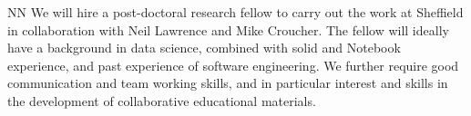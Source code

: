\begin{participant}[type=R, PM=36]{NN}
  We will hire a post-doctoral research fellow to carry out the work
  at Sheffield in collaboration with Neil Lawrence and Mike
  Croucher. The fellow will ideally have a background in data science,
  combined with solid \IPython and \Jupyter{} Notebook experience, and
  past experience of software engineering. We further require good
  communication and team working skills, and in particular interest
  and skills in the development of collaborative educational
  materials. 
\end{participant}